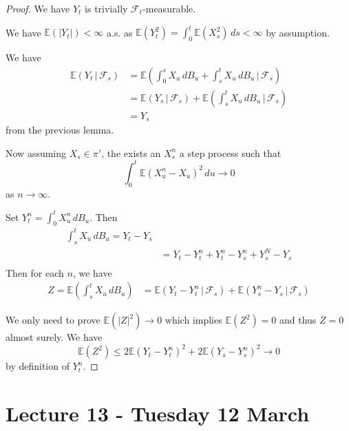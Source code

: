 \documentclass[10pt, oneside, reqno]{amsart}
\theoremstyle{plain}%
\theoremstyle{definition}
\theoremstyle{remark}
\newcommand{\given}{ \, | \,}
\newcommand{\E}{\mathbb{E}}
\newcommand{\sigf}{\mathcal{F}}
\begin{document}
\begin{proof}
    We have $Y_t$ is trivially $\sigf_t$-measurable.  
    
    We have $\E(|Y_t|) < \infty $ a.s. as $\E(Y_t^2) = \int_0^t \E(X_s^2) \, ds < \infty$ by assumption.  
    
    We have \begin{align*}
        \E(Y_t \given \sigf_s) &= \E(\int_0^s X_u \, dB_u + \int_s^t X_u \, dB_u \given \sigf_s ) \\
        &= \E(Y_s \given \sigf_s) + \E( \int_s^t X_u \, dB_u \given \sigf_s) \\
        &= Y_s          
    \end{align*}  from the previous lemma.
    
    Now assuming $X_s \in \pi'$, the exists an $X^n_s$ a step process such that \[
        \int_0^t \E(X^n_u - X_u)^2 \, du \rightarrow 0
    \] as $n \rightarrow \infty$.  
    
    Set $Y^n_t = \int_0^t X_u^n \, dB_u$.  Then \begin{align*}
        \int_s^t X_u \, dB_u = Y_t - Y_s \\
                            &= Y_t - Y_t^n + Y_t^n - Y_s^n + Y_s^N - Y_s \\         
    \end{align*}
    Then for each $n$, we have \begin{align*}
        Z = \E(\int_s^t X_u \, dB_u ) &= \E(Y_t - Y_t^n \given \sigf_s) + \E(Y_s^n - Y_s \given \sigf_s) 
    \end{align*}  
    
    We only need to prove $\E(|Z|^2) \rightarrow 0$ which implies $\E(Z^2) = 0$ and thus $Z = 0$ almost surely.  We have \[
        \E(Z^2) \leq 2\E(Y_t - Y_t^n)^2 + 2\E(Y_s - Y_s^n)^2 \rightarrow 0
    \] by definition of $Y_t^n$.
    
    
\end{proof}


\section{Lecture 13 - Tuesday 12 March} %
\label{sec:lecture_13_tuesday_12_march}
\end{document}
